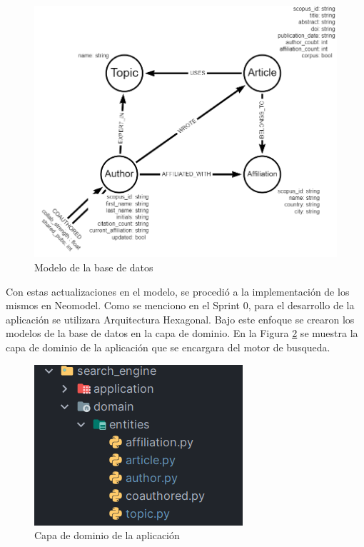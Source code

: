 \begin{figure}[H]
    \centering
    \includegraphics[scale=0.5]{../02Figures/02Chapter/Sprints/Sprint-3/centinela-graph.design-light.png}
    \caption{Modelo de la base de datos }
    \label{fig:neo4j-model}
\end{figure}

Con estas actualizaciones en el modelo, se procedió a la implementación de los mismos en Neomodel.
Como se menciono en el Sprint 0, para el desarrollo de la aplicación
se utilizara Arquitectura Hexagonal. Bajo este enfoque se crearon los modelos de la base de datos en la capa de dominio.
En la Figura \ref{fig:domain-layer} se muestra la capa de dominio de la aplicación que se encargara del motor de busqueda.

\begin{figure}[H]
    \centering
    \includegraphics[scale=0.9]{../02Figures/02Chapter/Sprints/Sprint-3/domain-layer.png}
    \caption{Capa de dominio de la aplicación}
    \label{fig:domain-layer}
\end{figure}

